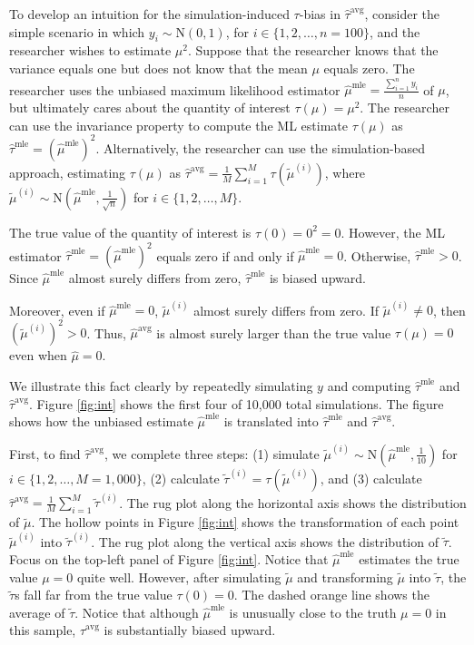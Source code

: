 \documentclass[11pt]{article}
\begin{document}
To develop an intuition for the simulation-induced $\tau$-bias in $\hat{\tau}^\text{avg}$, consider the simple scenario in which $y_i \sim \text{N}(0, 1)$, for $i \in \{1, 2, \ldots, n = 100\}$, and the researcher wishes to estimate $\mu^2$. Suppose that the researcher knows that the variance equals one but does not know that the mean $\mu$ equals zero. The researcher uses the unbiased maximum likelihood estimator $\hat{\mu}^\text{mle} = \frac{\sum_{i=1}^n y_i}{n}$ of $\mu$, but ultimately cares about the quantity of interest $\tau(\mu) = \mu^2$. The researcher can use the invariance property to compute the ML estimate $\tau(\mu)$ as $\hat{\tau}^\text{mle} = \left( \hat{\mu}^\text{mle} \right) ^2$. Alternatively, the researcher can use the simulation-based approach, estimating $\tau(\mu)$ as $\hat{\tau}^\text{avg} = \frac{1}{M} \sum_{i = 1}^M \tau \left( \tilde{\mu}^{(i)} \right)$, where $\tilde{\mu}^{(i)} \sim \text{N} \left( \hat{\mu}^\text{mle}, \frac{1}{\sqrt{n}} \right)$ for $i \in \{1, 2,\ldots, M\}$.

The true value of the quantity of interest is $\tau(0) = 0^2 = 0$. However, the ML estimator $\hat{\tau}^\text{mle} = \left( \hat{\mu}^\text{mle} \right)^2$ equals zero if and only if $\hat{\mu}^\text{mle} = 0$. Otherwise, $\hat{\tau}^\text{mle} > 0$. Since $\hat{\mu}^\text{mle}$ almost surely differs from zero,  $\hat{\tau}^\text{mle}$ is biased upward.

Moreover, even if $\hat{\mu}^\text{mle} = 0$, $\tilde{\mu}^{(i)}$ almost surely differs from zero. If $\tilde{\mu}^{(i)} \neq 0$, then $\left( \tilde{\mu}^{(i)} \right)^2 > 0$. Thus, $\hat{\mu}^\text{avg}$ is almost surely larger than the true value $\tau(\mu) = 0$ even when $\hat{\mu} = 0$.

We illustrate this fact clearly by repeatedly simulating $y$ and computing $\hat{\tau}^\text{mle}$ and $\hat{\tau}^\text{avg}$. Figure \ref{fig:int} shows the first four of 10,000 total simulations. The figure shows how the unbiased estimate $\hat{\mu}^\text{mle}$ is translated into $\hat{\tau}^\text{mle}$ and $\hat{\tau}^\text{avg}$.

First, to find $\hat{\tau}^\text{avg}$, we complete three steps: (1) simulate $\tilde{\mu}^{(i)} \sim \text{N} \left( \hat{\mu}^\text{mle}, \frac{1}{10{}} \right)$ for $i \in \{1, 2,\ldots, M = 1,000\}$, (2) calculate $\tilde{\tau}^{(i)} = \tau\left( \tilde{\mu}^{(i)} \right)$, and (3) calculate $\hat{\tau}^\text{avg} = \frac{1}{M} \sum_{i = 1}^M \tilde{\tau}^{(i)}$. The rug plot along the horizontal axis shows the distribution of $\tilde{\mu}$. The hollow points in Figure \ref{fig:int} shows the transformation of each point $\tilde{\mu}^{(i)}$ into $\tilde{\tau}^{(i)}$. The rug plot along the vertical axis shows the distribution of $\tilde{\tau}$.
Focus on the top-left panel of Figure \ref{fig:int}. Notice that $\hat{\mu}^\text{mle}$ estimates the true value $\mu = 0$ quite well. However, after simulating $\tilde{\mu}$ and transforming $\tilde{\mu}$ into $\tilde{\tau}$, the $\tilde{\tau}$s fall far from the true value $\tau(0) = 0$. The dashed orange line shows the average of $\tilde{\tau}$. Notice that although $\hat{\mu}^\text{mle}$ is unusually close to the truth $\mu = 0$ in this sample, $\hat{\tau}^\text{avg}$ is substantially biased upward.
\end{document}

